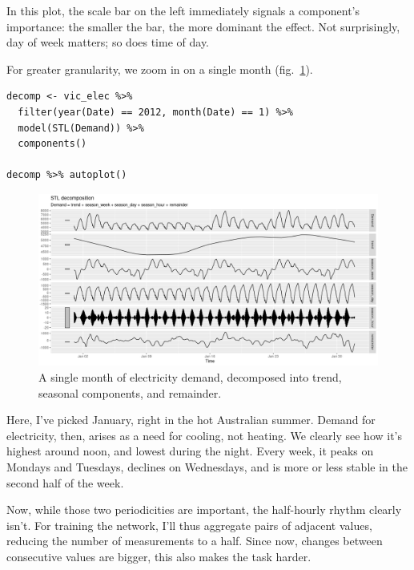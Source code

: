 \documentclass[
  letterpaper,
]{krantz}
\begin{document}
In this plot, the scale bar on the left immediately signals a
component's importance: the smaller the bar, the more dominant the
effect. Not surprisingly, day of week matters; so does time of day.

For greater granularity, we zoom in on a single month
(fig.~\ref{fig-timeseries-vic-elec-stl-month}).

\begin{verbatim}
decomp <- vic_elec %>% 
  filter(year(Date) == 2012, month(Date) == 1) %>%
  model(STL(Demand)) %>% 
  components()

decomp %>% autoplot()
\end{verbatim}

\begin{figure}[H]

{\centering \includegraphics{images/timeseries-vic-elec-stl-month.png}

}

\caption{\label{fig-timeseries-vic-elec-stl-month}A single month of
electricity demand, decomposed into trend, seasonal components, and
remainder.}

\end{figure}

Here, I've picked January, right in the hot Australian summer. Demand
for electricity, then, arises as a need for cooling, not heating. We
clearly see how it's highest around noon, and lowest during the night.
Every week, it peaks on Mondays and Tuesdays, declines on Wednesdays,
and is more or less stable in the second half of the week.

Now, while those two periodicities are important, the half-hourly rhythm
clearly isn't. For training the network, I'll thus aggregate pairs of
adjacent values, reducing the number of measurements to a half. Since
now, changes between consecutive values are bigger, this also makes the
task harder.
\end{document}
